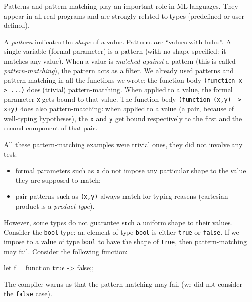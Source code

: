Patterns and pattern-matching play an important role in ML languages.
They appear in all real programs and are strongly related to types
(predefined or user-defined).

A {\em pattern} indicates the {\em shape} of a value.
Patterns are ``values with holes''.
A single variable (formal parameter) is a pattern (with no shape specified:
it matches any value).
When a value is {\em matched against} a pattern (this is called
{\em pattern-matching}), the pattern acts as a filter.
We already used patterns and pattern-matching in all the functions we wrote:
the function body {\tt (function x -> ...)} does (trivial) pattern-matching.
When applied to a value, the formal parameter {\tt x} gets bound to
that value.
The function body {\tt (function (x,y) -> x+y)} does also pattern-matching:
when applied to a value (a pair, because of well-typing hypotheses), the
{\tt x} and {\tt y} get bound respectively to the first and the second
component of that pair.
\par
All these pattern-matching examples were trivial ones, they did not involve any test:
\begin{itemize}
\item formal parameters such as {\tt x} do not impose any particular shape to the
value they are supposed to match;
\item pair patterns such as {\tt(x,y)} always match for typing reasons
(cartesian product is a {\em product type}).
\end{itemize}
However, some types do not guarantee such a uniform shape to their
values. Consider the {\tt bool} type: an element of type {\tt bool} is
either {\tt true} or {\tt false}.
%
%
If we impose to a value of type {\tt bool} to have the shape of {\tt true},
then pattern-matching may fail. Consider the following function:
\begin{caml_example}
let f = function true -> false;;
\end{caml_example}
The compiler warns us that the pattern-matching may fail (we did not
consider the {\tt false} case).

